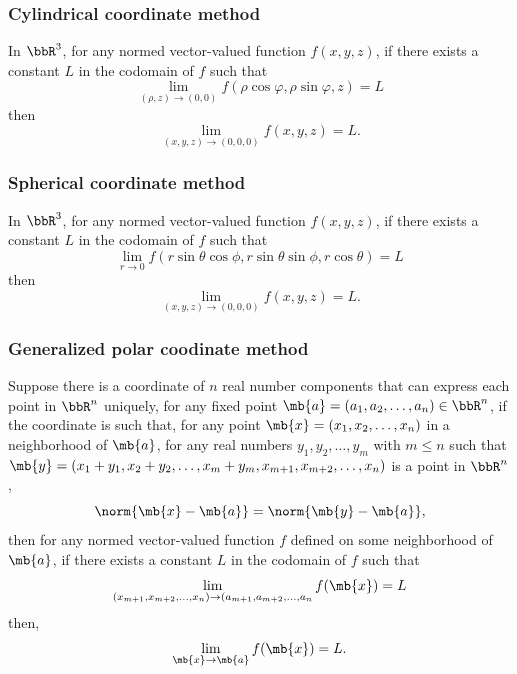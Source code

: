 \documentclass[a4paper,12pt]{report}
\begin{document}
\begin{itemize}
\begin{itemize}
\subsubsection{Cylindrical coordinate method}
In $\bbR^3$, for any normed vector-valued function $f(x,y,z)$, if there exists a constant $L$ in the codomain of $f$ such that
\[\lim_{(\rho,z)\to(0,0)}f(\rho\cos\varphi,\rho\sin\varphi,z)=L\]
then
\[\lim_{(x,y,z)\to(0,0,0)}f(x,y,z)=L.\]
\subsubsection{Spherical coordinate method}
In $\bbR^3$, for any normed vector-valued function $f(x,y,z)$, if there exists a constant $L$ in the codomain of $f$ such that
\[\lim_{r\to 0}f(r\sin\theta\cos\phi,r\sin\theta\sin\phi,r\cos\theta)=L\]
then
\[\lim_{(x,y,z)\to(0,0,0)}f(x,y,z)=L.\]
\subsubsection{Generalized polar coodinate method}
Suppose there is a coordinate of $n$ real number components that can express each point in $\bbR^n$ uniquely, for any fixed point $\mb{a}=(a_1,a_2,\ldots,a_n)\in\bbR^n$, if the coordinate is such that, for any point $\mb{x}=(x_1,x_2,\ldots,x_n)$ in a neighborhood of $\mb{a}$, for any real numbers $y_1,y_2,\ldots,y_m$ with $m\leq n$ such that $\mb{y}=(x_1+y_1,x_2+y_2,\ldots,x_m+y_m,x_{m+1},x_{m+2},\ldots,x_n)$ is a point in $\bbR^n$,
\[\norm{\mb{x}-\mb{a}}=\norm{\mb{y}-\mb{a}},\]
then for any normed vector-valued function $f$ defined on some neighborhood of $\mb{a}$, if there exists a constant $L$ in the codomain of $f$ such that
\[\lim_{(x_{m+1},x_{m+2},\ldots,x_n)\to(a_{m+1},a_{m+2},\ldots,a_n}f(\mb{x})=L\]
then,
\[\lim_{\mb{x}\to\mb{a}}f(\mb{x})=L.\]

\end{itemize}
\end{itemize}
\end{document}
